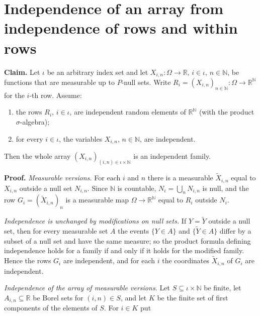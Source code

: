 \documentclass[11pt,a4paper]{article}
\begin{document}
\section{\texorpdfstring{Independence of an array from independence of rows and within rows}{Independence of an array from independence of rows and within rows}}


\textbf{Claim.} Let \(\iota\) be an arbitrary index set and let \(X_{i,n}:\Omega\to\mathbb R\), \(i\in\iota\), \(n\in\mathbb N\), be functions that are measurable up to \(P\)-null sets. Write \(R_i=(X_{i,n})_{n\in\mathbb N}:\Omega\to\mathbb R^{\mathbb N}\) for the \(i\)-th row. Assume:



\begin{enumerate}


\item the rows \(R_i\), \(i\in\iota\), are independent random elements of \(\mathbb R^{\mathbb N}\) (with the product \(\sigma\)-algebra);

\item for every \(i\in\iota\), the variables \(X_{i,n}\), \(n\in\mathbb N\), are independent.

\end{enumerate}



Then the whole array \((X_{i,n})_{(i,n)\in\iota\times\mathbb N}\) is an independent family.




\textbf{Proof.} \emph{Measurable versions.} For each \(i\) and \(n\) there is a measurable \(\tilde X_{i,n}\) equal to \(X_{i,n}\) outside a null set \(N_{i,n}\). Since \(\mathbb N\) is countable, \(N_i=\bigcup_nN_{i,n}\) is null, and the row \(G_i=(\tilde X_{i,n})_{n}\) is a measurable map \(\Omega\to\mathbb R^{\mathbb N}\) equal to \(R_i\) outside \(N_i\).




\emph{Independence is unchanged by modifications on null sets.} If \(Y=\tilde Y\) outside a null set, then for every measurable set \(A\) the events \(\{Y\in A\}\) and \(\{\tilde Y\in A\}\) differ by a subset of a null set and have the same measure; so the product formula defining independence holds for a family if and only if it holds for the modified family. Hence the rows \(G_i\) are independent, and for each \(i\) the coordinates \(\tilde X_{i,n}\) of \(G_i\) are independent.




\emph{Independence of the array of measurable versions.} Let \(S\subseteq\iota\times\mathbb N\) be finite, let \(A_{i,n}\subseteq\mathbb R\) be Borel sets for \((i,n)\in S\), and let \(K\) be the finite set of first components of the elements of \(S\). For \(i\in K\) put
\end{document}
